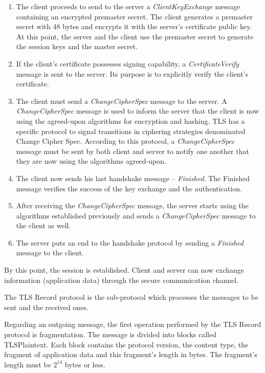 \documentclass{sig-alternate-05-2015}
\begin{document}
\begin{enumerate}
\item {The client proceeds to send to the server a \textit{ClientKeyExchange} message containing an encrypted premaster secret. The client generates a premaster secret with 48 bytes and encrypts it with the server's certificate public key. At this point, the server and the client use the premaster secret to generate the session keys and the master secret.}

\item {If the client's certificate possesses signing capability, a \textit{CertificateVerify} message is sent to the server. Its purpose is to explicitly verify the client's certificate.}

\item {The client must send a \textit{ChangeCipherSpec} message to the server. A \textit{ChangeCipherSpec} message is used to inform the server that the client is now using the agreed-upon algorithms for encryption and hashing. TLS has a specific protocol to signal transitions in ciphering strategies denominated Change Cipher Spec. According to this protocol, a \textit{ChangeCipherSpec} message must be sent by both client and server to notify one another that they are now using the algorithms agreed-upon.}

\item {The client now sends his last handshake message -- \textit{Finished}. The Finished message verifies the success of the key exchange and the authentication.}

\item {After receiving the \textit{ChangeCipherSpec} message, the server starts using the algorithms established previously and sends a \textit{ChangeCipherSpec} message to the client as well.}

\item {The server puts an end to the handshake protocol by sending a \textit{Finished} message to the client.}

\end{enumerate}

By this point, the session is established. Client and server can now exchange information (application data) through the secure communication channel.

The TLS Record protocol is the sub-protocol which processes the messages to be sent and the received ones.

Regarding an outgoing message, the first operation performed by the TLS Record protocol is fragmentation. The message is divided into blocks called TLSPlaintext. Each block contains the protocol version, the content type, the fragment of application data and this fragment's length in bytes. The fragment's length must be $2^{14}$ bytes or less.
\end{document}
